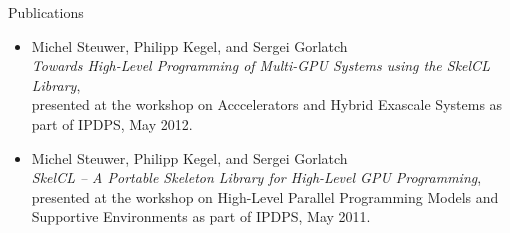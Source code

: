 \documentclass[letterpaper]{resume} %
\begin{document}
\begin{rSection}{Publications %
  }
\begin{itemize}

  \item Michel Steuwer, Philipp Kegel, and Sergei Gorlatch\\
    \emph{Towards High-Level Programming of Multi-GPU Systems using the
      SkelCL Library},\\
    presented at the workshop on Acccelerators and Hybrid Exascale Systems as
    part of IPDPS, May 2012.




  \item Michel Steuwer, Philipp Kegel, and Sergei Gorlatch\\
    \emph{SkelCL -- A Portable Skeleton Library for High-Level GPU
      Programming},\\
    presented at the workshop on High-Level Parallel Programming Models and
    Supportive Environments as part of IPDPS, May 2011.
\end{itemize}

\end{rSection}
\end{document}
